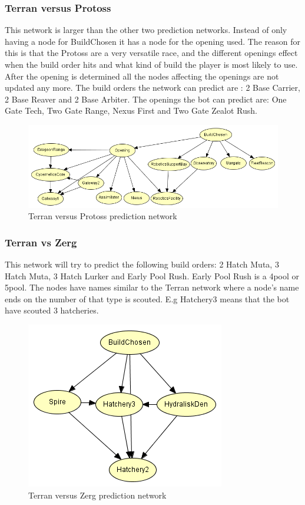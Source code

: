 \subsubsection{Terran versus Protoss}
	This network is larger than the other two prediction networks. Instead of only having a node for BuildChosen it has a node for the opening 
	used. The reason for this is that the Protoss are a very versatile race, and the different openings effect when the build order hits and what kind of build 
	the player is most likely to use. After the opening is determined all the nodes affecting the openings are not updated any more. The build orders 
	the network can predict are : 2 Base Carrier, 2 Base Reaver and 2 Base Arbiter. The openings the bot can predict are: One Gate Tech, Two Gate Range, 
	Nexus First and Two Gate Zealot Rush.

\begin{figure}[H]
	\includegraphics[scale=0.7]{Figures/BayesianPictures/tvp.png}
	\caption{Terran versus Protoss prediction network}
	\label{fig:tvpnetwork}
\end{figure}	

\subsubsection{Terran vs Zerg}
	This network will try to predict the following build orders: 2 Hatch Muta, 3 Hatch Muta, 3 Hatch Lurker and Early Pool Rush. Early Pool Rush is a 4pool or 5pool. The nodes have names similar to the Terran network where a node's name ends on the number of that type is scouted. 
	E.g Hatchery3 means that the bot have scouted 3 hatcheries.

\begin{figure}[H]
	\includegraphics[scale=1]{Figures/BayesianPictures/tvz.png}
	\caption{Terran versus Zerg prediction network}
	\label{fig:tvznetwork}
\end{figure}	
		
